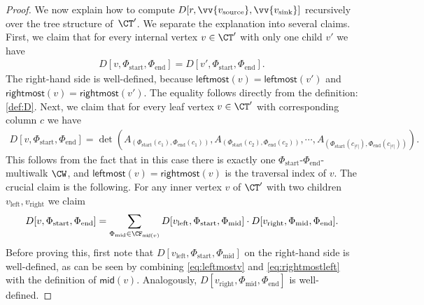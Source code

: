 \begin{proof}
We now explain how to compute $D[r, \vv{v_{\textup{source}}}, \vv{v_{\textup{sink}}}]$ recursively over the tree structure of~$\CT'$. We separate the explanation into several claims.
First, we claim that for every internal vertex $v \in \CT'$ with only one child $v'$ we have
\begin{align}\label{eq:claimonlychild}
    D[v, \Phi_\text{start}, \Phi_\text{end}] = D[v', \Phi_\text{start}, \Phi_\text{end}].
\end{align}
The right-hand side is well-defined, because $\textsf{leftmost}(v)=\textsf{leftmost}(v')$ and $\textsf{rightmost}(v)=\textsf{rightmost}(v')$. The equality follows directly from the definition: \eqref{def:D}.
Next, we claim that for every leaf vertex $v \in \CT'$ with corresponding column $c$ we have
\begin{align}\label{eq:claimleaf}
    D[v, \Phi_\text{start}, \Phi_\text{end}] = \det(A_{(\Phi_\text{start}(c_1), \Phi_\text{end}(c_1))}, A_{(\Phi_\text{start}(c_2), \Phi_\text{end}(c_2))}, \cdots, A_{(\Phi_\text{start}(c_{|c|}), \Phi_\text{end}(c_{|c|}))}).
\end{align}
This follows from the fact that in this case there is exactly one $\Phi_\text{start}$-$ \Phi_\text{end}$-multiwalk $\CW$, and 
$\textsf{leftmost}(v)=\textsf{rightmost}(v)$ is the traversal index of $v$.
The crucial claim is the following.
For any inner vertex $v$ of $\CT'$ with two children $v_\text{left}, v_\text{right}$ we claim
\begin{align}\label{eq:claimdistributive}
    D[v, \Phi_\text{start}, \Phi_\text{end}] = \sum_{\Phi_\text{mid} \in \CF_{\textsf{mid}(v)}} D[v_\text{left},\Phi_\text{start}, \Phi_\text{mid}] \cdot D[v_\text{right},\Phi_\text{mid}, \Phi_\text{end}].
\end{align}
Before proving this, first note that $D[v_\text{left},\Phi_\text{start}, \Phi_\text{mid}]$ on the right-hand side is well-defined, as can be seen by combining \eqref{eq:leftmostv} and \eqref{eq:rightmostleft} with the definition of $\textsf{mid}(v)$.
Analogously, $D[v_\text{right},\Phi_\text{mid}, \Phi_\text{end}]$ is well-defined.


\end{proof}
